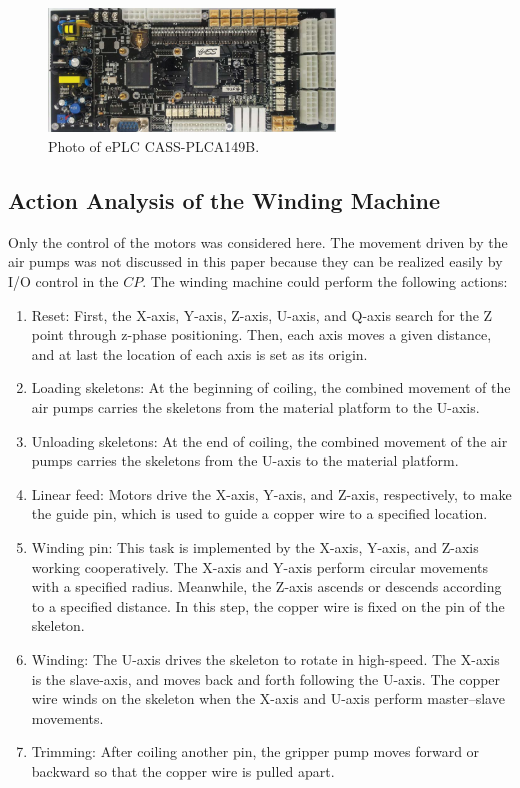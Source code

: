 \documentclass[journal]{IEEEtran}
\begin{document}
\begin{figure}
	\centering
	\includegraphics[width=3in]{fig/FIG15_TII-18-0024.eps}
	\caption{Photo of ePLC CASS-PLCA149B.}
	\label{fig:controlboard}
\end{figure}
\subsection{Action Analysis of the Winding Machine}
Only the control of the motors was considered here. The movement driven by the air pumps was not discussed in this paper because they can be realized easily by I/O control in the $CP$. The winding machine could perform the following actions:

\begin{enumerate}
	\item	Reset: First, the X-axis, Y-axis, Z-axis, U-axis, and Q-axis search for the Z point through z-phase positioning. Then, each axis moves a given distance, and at last the location of each axis is set as its origin.
	\item	Loading skeletons: At the beginning of coiling, the combined movement of the air pumps carries the skeletons from the material platform to the U-axis.
	\item	Unloading skeletons: At the end of coiling, the combined movement of the air pumps carries the skeletons from the U-axis to the material platform.
	\item   Linear feed: Motors drive the X-axis, Y-axis, and Z-axis, respectively, to make the guide pin, which is used to guide a copper wire to a specified location.
	\item	Winding pin: This task is implemented by the X-axis, Y-axis, and Z-axis working cooperatively. The X-axis and Y-axis perform circular movements with a specified radius. Meanwhile, the Z-axis ascends or descends according to a specified distance. In this step, the copper wire is fixed on the pin of the skeleton.
	\item	Winding: The U-axis drives the skeleton to rotate in high-speed. The X-axis is the slave-axis, and moves back and forth following the U-axis. The copper wire winds on the skeleton when the X-axis and U-axis perform master–slave movements.
	\item	Trimming: After coiling another pin, the gripper pump moves forward or backward so that the copper wire is pulled apart.

\end{enumerate}
\end{document}
